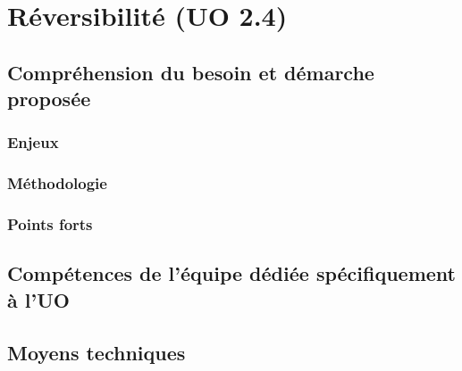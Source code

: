 	\section{Réversibilité (UO 2.4)}
	\subsection{Compréhension du besoin et démarche proposée}
	\subsubsection{Enjeux}
	\subsubsection{Méthodologie}
	\subsubsection{Points forts}
	\subsection{Compétences de l'équipe dédiée spécifiquement à l'UO}	
	\subsection{Moyens techniques}